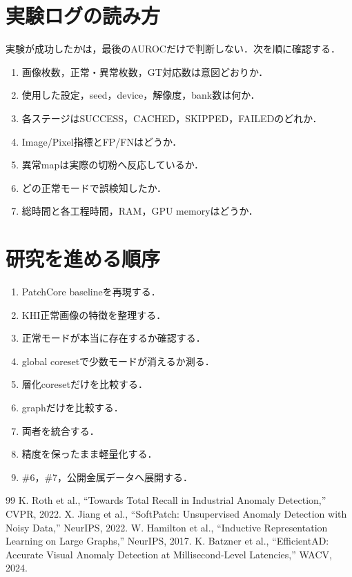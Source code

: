 \documentclass[a4paper,11pt]{ltjsarticle}
\begin{document}
\section{実験ログの読み方}
実験が成功したかは，最後のAUROCだけで判断しない．次を順に確認する．
\begin{enumerate}
  \item 画像枚数，正常・異常枚数，GT対応数は意図どおりか．
  \item 使用した設定，seed，device，解像度，bank数は何か．
  \item 各ステージはSUCCESS，CACHED，SKIPPED，FAILEDのどれか．
  \item Image/Pixel指標とFP/FNはどうか．
  \item 異常mapは実際の切粉へ反応しているか．
  \item どの正常モードで誤検知したか．
  \item 総時間と各工程時間，RAM，GPU memoryはどうか．
\end{enumerate}

\section{研究を進める順序}
\begin{enumerate}
  \item PatchCore baselineを再現する．
  \item KHI正常画像の特徴を整理する．
  \item 正常モードが本当に存在するか確認する．
  \item global coresetで少数モードが消えるか測る．
  \item 層化coresetだけを比較する．
  \item graphだけを比較する．
  \item 両者を統合する．
  \item 精度を保ったまま軽量化する．
  \item \#6，\#7，公開金属データへ展開する．
\end{enumerate}

\begin{thebibliography}{99}
 K. Roth et al., ``Towards Total Recall in Industrial Anomaly Detection,'' CVPR, 2022.
 X. Jiang et al., ``SoftPatch: Unsupervised Anomaly Detection with Noisy Data,'' NeurIPS, 2022.
 W. Hamilton et al., ``Inductive Representation Learning on Large Graphs,'' NeurIPS, 2017.
 K. Batzner et al., ``EfficientAD: Accurate Visual Anomaly Detection at Millisecond-Level Latencies,'' WACV, 2024.
\end{thebibliography}
\end{document}
